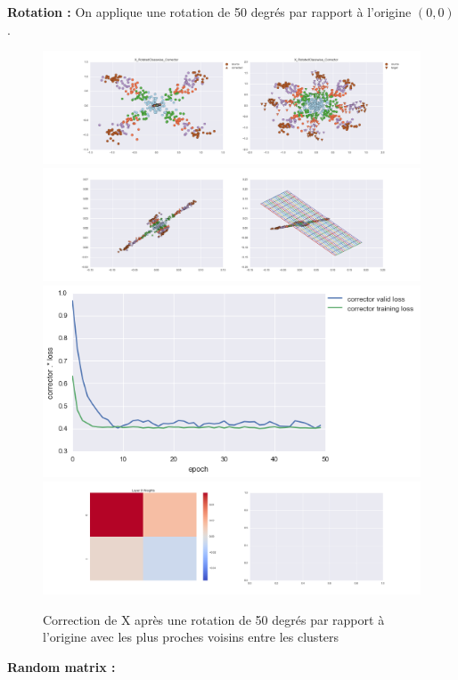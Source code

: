 
{\Large \textbf{Rotation :}} On applique une rotation de 50 degrés par rapport à l'origine $(0,0)$.

\begin{figure}[H] %
\centering
\includegraphics[width=\linewidth]{fig/24-05-2016/X/X_RotatedClasswise_Corrector-DATA.png}
\includegraphics[width=\linewidth]{fig/24-05-2016/X/X_RotatedClasswise_Corrector-GridCheck.png}
\includegraphics[width=0.45\linewidth]{fig/24-05-2016/X/X_RotatedClasswise_Corrector-Learning_curve.png}
\includegraphics[width=\linewidth]{fig/24-05-2016/X/X_RotatedClasswise_Corrector-W.png}
\caption{Correction de X après une rotation de 50 degrés par rapport à l'origine avec les plus proches voisins entre les clusters}
\label{fig:recap-X-rot-classwise}
\end{figure}

{\Large \textbf{Random matrix :}}

